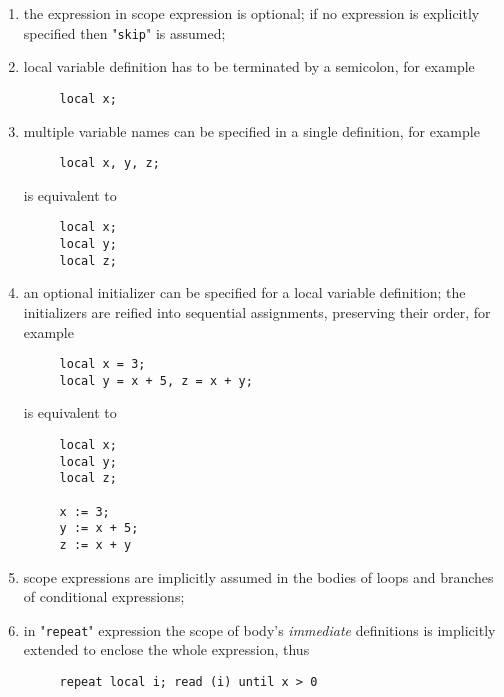 \documentclass{article}
\theoremstyle{definition}
\begin{document}
\begin{enumerate}
\item the expression in scope expression is optional; if no expression is explicitly specified then "\lstinline|skip|" is assumed;
\item local variable definition has to be terminated by a semicolon, for example

  \begin{lstlisting}
     local x;
  \end{lstlisting}

\item multiple variable names can be specified in a single definition, for example

  \begin{lstlisting}
     local x, y, z;
  \end{lstlisting}

  is equivalent to

  \begin{lstlisting}
     local x;
     local y;
     local z;
  \end{lstlisting}

\item an optional initializer can be specified for a local variable definition; the initializers are reified into sequential assignments,
  preserving their order, for example

  \begin{lstlisting}
     local x = 3;
     local y = x + 5, z = x + y;
  \end{lstlisting}

  is equivalent to

  \begin{lstlisting}
     local x;
     local y;
     local z;

     x := 3;
     y := x + 5;
     z := x + y
  \end{lstlisting}

\item scope expressions are implicitly assumed in the bodies of loops and branches of conditional expressions;

\item in "\lstinline|repeat|" expression the scope of body's \emph{immediate} definitions is implicitly extended to enclose the
  whole expression, thus

  \begin{lstlisting}
     repeat local i; read (i) until x > 0
  \end{lstlisting}


\end{enumerate}
\end{document}
